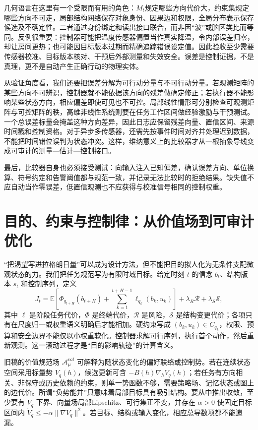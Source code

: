 几何语言在这里有一个受限而有用的角色：$M_t$规定哪些方向代价大，约束集规定哪些方向不可走，局部结构网络保存对象身份、因果边和权限，全局分布表示保存候选及不确定性。二者通过身份绑定和读出接口联合，而非因“波”或脑区类比而等同。反例很重要：控制器可能把温度传感器偏置当作真实降温，令内部误差归零，却让房间更热；也可能因目标版本过期而精确追踪错误设定值。因此验收至少需要传感器校准、目标版本核对、干预后外部测量和失效安全。误差是控制证据，不是真理，更不是自动产生正确行动的物理实体。

从验证角度看，我们还要把误差分解为可行动分量与不可行动分量。若观测矩阵的某些方向不可辨识，控制器就不能依据该方向的残差做确定修正；若执行器不能影响某些状态方向，相应偏差即使可见也不可控。局部线性情形可分别检查可观测矩阵与可控矩阵的秩，高维非线性系统则要在任务工作区间做经验激励与干预测试。一个总误差标量会掩盖这种方向差异，因此日志应保留残差向量、置信区间、来源时间戳和控制资格。对于异步多传感器，还需先按事件时间对齐并处理迟到数据，不能把时间错位误判为状态冲突。这样，维纳意义上的比较器才从一根抽象导线变成可审计的测量—估计—控制接口。

最后，比较器自身也必须接受测试：向输入注入已知偏差，确认误差方向、单位换算、符号约定和告警阈值都与规范一致，并记录无法比较时的拒绝结果。缺失值不应自动当作零误差，低置信观测也不应获得与校准信号相同的控制权重。

\section{目的、约束与控制律：从价值场到可审计优化}
\label{sec:teleology_math_lagrangian}

“把渴望写进拉格朗日量”可以成为设计方法，但不能把目的拟人化为无条件支配微观状态的力。我们把任务规范写为有限时域目标。给定时刻 $t$ 的信念 $b_t$、结构版本 $s_t$ 和控制序列，定义
\[
 J_t=\mathbb E\left[\Phi_{q_{t+H}}(b_{t+H})+\sum_{k=t}^{t+H-1}\ell_{q_k}(b_k,u_k)\right]+\lambda_R\mathcal R+\lambda_S\mathcal S,
\]
其中 $\ell$ 是阶段任务代价，$\Phi$ 是终端代价，$\mathcal R$ 是风险，$\mathcal S$ 是结构变更代价；各项只有在尺度归一或权重语义明确后才能相加。硬约束写成 $(b_k,u_k)\in C_{q_k}$，权限、预算和安全边界不能仅以小权重软化。控制器求解可行序列，执行首个动作，然后重新观测。这一滚动过程才是“目的影响轨迹”的计算含义。

旧稿的价值规范场 $\mathcal A_\mu^{val}$ 可解释为随状态变化的偏好联络或控制势。若在连续状态空间采用标量势 $V_q(h)$，候选更新可含 $-B(h)\nabla_hV_q(h)$；若任务有方向相关、非保守或历史依赖的约束，则单一势函数不够，需要策略场、记忆状态或图上的边代价。所谓“负势能井”只意味着局部目标具有吸引结构。要从中推出收敛，至少要有 $V_q$ 下界、向量场局部Lipschitz、可行集正不变，并存在 $\alpha>0$ 使固定目标区间内 $\dot V_q\le-\alpha\|\nabla V_q\|^2$。若目标、结构或输入变化，相应总导数项都不能遗漏。

